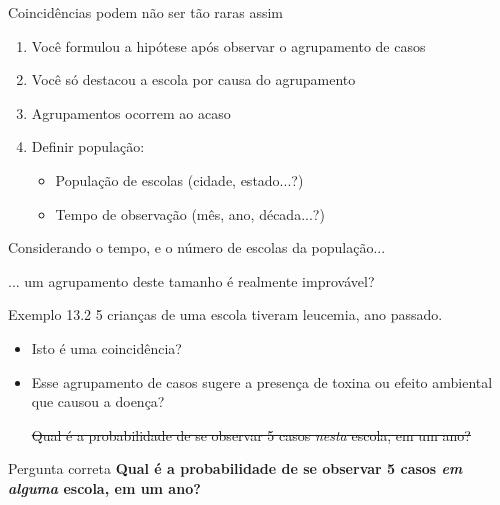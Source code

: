 \documentclass{beamer}
\begin{document}
\begin{frame}{\small Coincidências podem não ser tão raras assim}
  \begin{enumerate}
    \footnotesize
  \item Você formulou a hipótese após observar o agrupamento de casos
    \bigskip
  \item Você só destacou a escola por causa do agrupamento
    \bigskip
  \item Agrupamentos ocorrem ao acaso
    \bigskip
  \item Definir população:
    \begin{itemize}
    \item População de escolas (cidade, estado...?)
    \item Tempo de observação (mês, ano, década...?)
    \end{itemize}
  \end{enumerate}
  \begin{block}{}
    \small
    Considerando o tempo, e o número de escolas da população...

    \bigskip
    ... um agrupamento deste tamanho é realmente improvável?
  \end{block}
\end{frame}

\begin{frame}
  \begin{exampleblock}{Exemplo 13.2}
    \footnotesize
    5 crianças de uma escola tiveram leucemia, ano passado.

    \begin{itemize}
    \item Isto é uma coincidência?
    \item Esse agrupamento de casos sugere a presença de toxina ou efeito ambiental que causou a doença?

      \bigskip
      \begin{exampleblock}{}
      \sout{Qual é a probabilidade de se observar 5 casos {\em nesta} escola, em um ano?}
    \end{exampleblock}

    \end{itemize}
  \end{exampleblock}
  \begin{exampleblock}{Pergunta correta}
    \small
    {\bf Qual é a probabilidade de se observar 5 casos {\em em alguma} escola, em um ano?}
  \end{exampleblock}
\end{frame}
\end{document}
